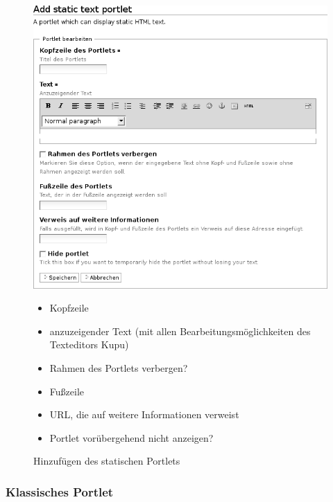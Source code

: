 \documentclass[a4paper,12pt,ngerman]{manual}
\begin{document}
\hypertarget{fig-statisches-portlet-hinzufuegen}{}\begin{figure}[htbp]
\centering

\includegraphics{statisches-portlet-hinzufuegen.png}
\caption{Hinzufügen des statischen Portlets}{\small \begin{itemize}
\item {} 
Kopfzeile

\item {} 
anzuzeigender Text (mit allen Bearbeitungsmöglichkeiten des Texteditors
Kupu)

\item {} 
Rahmen des Portlets verbergen?

\item {} 
Fußzeile

\item {} 
URL, die auf weitere Informationen verweist

\item {} 
Portlet vorübergehend nicht anzeigen?

\end{itemize}
}\end{figure}


\subsubsection{Klassisches Portlet}
\end{document}
